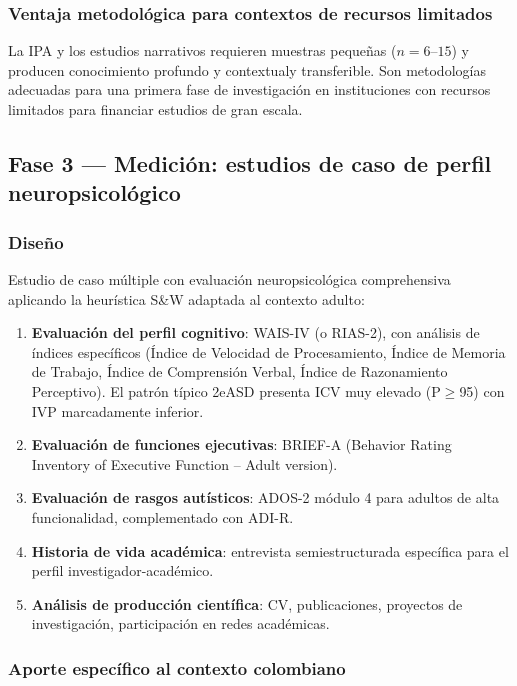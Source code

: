 \subsubsection{Ventaja metodológica para contextos de recursos limitados}

La IPA y los estudios narrativos requieren muestras pequeñas ($n=6$--$15$)
y producen conocimiento profundo y contextualy transferible. Son metodologías
adecuadas para una primera fase de investigación en instituciones con recursos
limitados para financiar estudios de gran escala.

\subsection{Fase 3 — Medición: estudios de caso de perfil neuropsicológico}

\subsubsection{Diseño}

Estudio de caso múltiple con evaluación neuropsicológica comprehensiva aplicando
la heurística S\&W \parencite{burgerveltmeijer2023} adaptada al contexto adulto:

\begin{enumerate}[leftmargin=*, itemsep=2pt]
    \item \textbf{Evaluación del perfil cognitivo}: WAIS-IV (o RIAS-2),
    con análisis de índices específicos (Índice de Velocidad de Procesamiento,
    Índice de Memoria de Trabajo, Índice de Comprensión Verbal, Índice de
    Razonamiento Perceptivo). El patrón típico 2eASD presenta ICV muy elevado
    (P$\geq$95) con IVP marcadamente inferior.
    \item \textbf{Evaluación de funciones ejecutivas}: BRIEF-A (Behavior Rating
    Inventory of Executive Function -- Adult version).
    \item \textbf{Evaluación de rasgos autísticos}: ADOS-2 módulo 4 para adultos
    de alta funcionalidad, complementado con ADI-R.
    \item \textbf{Historia de vida académica}: entrevista semiestructurada
    específica para el perfil investigador-académico.
    \item \textbf{Análisis de producción científica}: CV, publicaciones, proyectos
    de investigación, participación en redes académicas.
\end{enumerate}

\subsubsection{Aporte específico al contexto colombiano}

